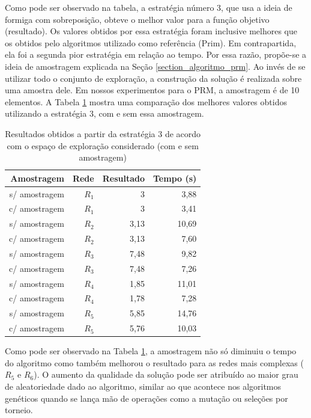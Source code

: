 Como pode ser observado na tabela, a estratégia número 3, que usa a ideia de formiga com sobreposição, obteve o melhor valor para a função objetivo (resultado). Os valores obtidos por essa estratégia foram inclusive melhores que os obtidos pelo algoritmos utilizado como referência (Prim). Em contrapartida, ela foi a segunda pior estratégia em relação ao tempo. Por essa razão, propõe-se a ideia de amostragem explicada na Seção \ref{section_algoritmo_prm}. Ao invés de se utilizar todo o conjunto de exploração, a construção da solução é realizada sobre uma amostra dele. Em nossos experimentos para o PRM, a amostragem é de 10 elementos. A Tabela \ref{tab_exp2_amostragem} mostra uma comparação dos melhores valores obtidos utilizando a estratégia 3, com e sem essa amostragem.

\begin{table}[!htbp]
	\centering
	\caption{Resultados obtidos a partir da estratégia 3 de acordo com o espaço de exploração considerado (com e sem amostragem)}
	\label{tab_exp2_amostragem}
	\begin{tabular}{rrrr}
		Amostragem    & Rede & Resultado   & Tempo (s) \\ \hline
		s/ amostragem & $R_1$    & 3 & 3,88      \\
		\rowcolor{table-green}
		c/ amostragem & $R_1$    & 3 & 3,41      \\ \hline
		s/ amostragem & $R_2$    & 3,13 & 10,69    \\
		\rowcolor{table-green}
		c/ amostragem & $R_2$    & 3,13 & 7,60     \\ \hline
		s/ amostragem & $R_3$    & 7,48 & 9,82     \\
		\rowcolor{table-green}
		c/ amostragem & $R_3$    & 7,48 & 7,26      \\ \hline
		s/ amostragem & $R_4$    & 1,85 & 11,01    \\
		\rowcolor{table-green}
		c/ amostragem & $R_4$    & 1,78 & 7,28      \\ \hline
		s/ amostragem & $R_5$    & 5,85 & 14,76    \\
		\rowcolor{table-green}
		c/ amostragem & $R_5$    & 5,76  & 10,03    \\ \hline
	\end{tabular}
\end{table}

Como pode ser observado na Tabela \ref{tab_exp2_amostragem}, a amostragem não só diminuiu o tempo do algoritmo como também melhorou o resultado para as redes mais complexas ($R_5$ e $R_6$). O aumento da qualidade da solução pode ser atribuído ao maior grau de aleatoriedade dado ao algoritmo, similar ao que acontece nos algoritmos genéticos quando se lança mão de operações como a mutação ou seleções por torneio.

